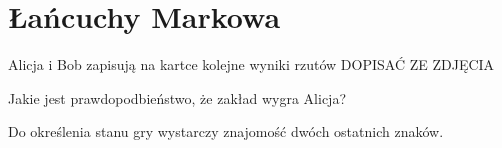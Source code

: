 \section{Łańcuchy Markowa}

\begin{example}
  \item Alicja i Bob zapisują na kartce kolejne wyniki rzutów {\large\color{red}DOPISAĆ ZE ZDJĘCIA}

    Jakie jest prawdopodbieństwo, że zakład wygra Alicja?

    Do określenia stanu gry wystarczy znajomość dwóch ostatnich znaków.
\end{example}
